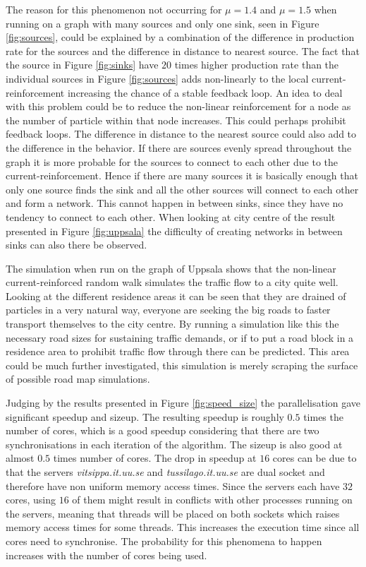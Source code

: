 The reason for this phenomenon not occurring for $\mu = 1.4$ and $\mu = 1.5$ when running on a graph with many sources and only one sink, seen in Figure \ref{fig:sources}, could be explained by a combination of the difference in production rate for the sources and the difference in distance to nearest source. The fact that the source in Figure \ref{fig:sinks} have $20$ times higher production rate than the individual sources in Figure \ref{fig:sources} adds non-linearly to the local current-reinforcement increasing the chance of a stable feedback loop. An idea to deal with this problem could be to reduce the non-linear reinforcement for a node as the number of particle within that node increases. This could perhaps prohibit feedback loops. The difference in distance to the nearest source could also add to the difference in the behavior. If there are sources evenly spread throughout the graph it is more probable for the sources to connect to each other due to the current-reinforcement. Hence if there are many sources it is basically enough that only one source finds the sink and all the other sources will connect to each other and form a network. This cannot happen in between sinks, since they have no tendency to connect to each other. When looking at city centre of the result presented in Figure \ref{fig:uppsala} the difficulty of creating networks in between sinks can also there be observed.

The simulation when run on the graph of Uppsala shows that the non-linear current-reinforced random walk simulates the traffic flow to a city quite well. Looking at the different residence areas it can be seen that they are drained of particles in a very natural way, everyone are seeking the big roads to faster transport themselves to the city centre. By running a simulation like this the necessary road sizes for sustaining traffic demands, or if to put a road block in a residence area to prohibit traffic flow through there can be predicted. This area could be much further investigated, this simulation is merely scraping the surface of possible road map simulations.

Judging by the results presented in Figure \ref{fig:speed_size} the parallelisation gave significant speedup and sizeup. The resulting speedup is roughly $0.5$ times the number of cores, which is a good speedup considering that there are two synchronisations in each iteration of the algorithm. The sizeup is also good at almost $0.5$ times number of cores. The drop in speedup at $16$ cores can be due to that the servers \textit{vitsippa.it.uu.se} and \textit{tussilago.it.uu.se} are dual socket and therefore have non uniform memory access times. Since the servers each have $32$ cores, using $16$ of them might result in conflicts with other processes running on the servers, meaning that threads will be placed on both sockets which raises memory access times for some threads. This increases the execution time since all cores need to synchronise. The probability for this phenomena to happen increases with the number of cores being used.

